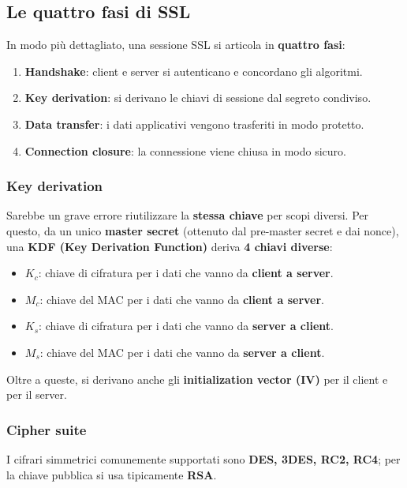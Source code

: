 \subsection{Le quattro fasi di SSL}
In modo più dettagliato, una sessione SSL si articola in \textbf{quattro fasi}:
\begin{enumerate}
    \item \textbf{Handshake}: client e server si autenticano e concordano gli algoritmi.
    \item \textbf{Key derivation}: si derivano le chiavi di sessione dal segreto condiviso.
    \item \textbf{Data transfer}: i dati applicativi vengono trasferiti in modo protetto.
    \item \textbf{Connection closure}: la connessione viene chiusa in modo sicuro.
\end{enumerate}

\subsubsection{Key derivation}
Sarebbe un grave errore riutilizzare la \textbf{stessa chiave} per scopi diversi. Per questo, da un unico \textbf{master secret} (ottenuto dal pre-master secret e dai nonce), una \textbf{KDF (Key Derivation Function)} deriva \textbf{4 chiavi diverse}:
\begin{itemize}
    \item $K_c$: chiave di cifratura per i dati che vanno da \textbf{client a server}.
    \item $M_c$: chiave del MAC per i dati che vanno da \textbf{client a server}.
    \item $K_s$: chiave di cifratura per i dati che vanno da \textbf{server a client}.
    \item $M_s$: chiave del MAC per i dati che vanno da \textbf{server a client}.
\end{itemize}
Oltre a queste, si derivano anche gli \textbf{initialization vector (IV)} per il client e per il server.

\subsubsection{Cipher suite}
I cifrari simmetrici comunemente supportati sono \textbf{DES, 3DES, RC2, RC4}; per la chiave pubblica si usa tipicamente \textbf{RSA}.

